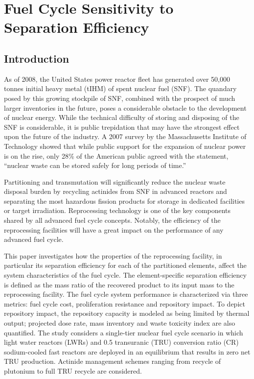 \chapter{Fuel Cycle Sensitivity to Separation Efficiency}
\label{ses_paper}



\section{Introduction}
\label{ses_sec:intro}
As of 2008, the United States power reactor fleet has generated over
50,000 tonnes initial heavy metal (tIHM) of spent nuclear fuel (SNF). 
The quandary posed by this growing stockpile of SNF, combined with the
prospect of much larger inventories in the future, poses a considerable
obstacle to the development of nuclear energy.  While the technical
difficulty of storing and disposing of the SNF is considerable, it is
public trepidation that may have the strongest effect upon the future of
the industry.  A 2007 survey by the Massachusetts Institute of
Technology showed that while public support for the expansion of nuclear
power is on the rise, only 28\% of the American public agreed with the
statement, ``nuclear waste can be stored safely for long periods
of time.'' \cite{}

Partitioning and transmutation will significantly reduce the nuclear
waste disposal burden by recycling actinides from SNF in advanced
reactors and separating the most hazardous fission products for storage
in dedicated facilities or target irradiation.  Reprocessing technology
is one of the key components shared by all advanced fuel cycle concepts.
 Notably, the efficiency of the reprocessing facilities will have a
great impact on the performance of any advanced fuel cycle. 

This paper investigates how the properties of the reprocessing facility,
in particular its separation efficiency for each of the partitioned
elements, affect the system characteristics of the fuel cycle. The
element-specific separation efficiency is defined as the mass ratio of
the recovered product to its input mass to the reprocessing facility. 
The fuel cycle system performance is characterized via three metrics:
fuel cycle cost, proliferation resistance and repository impact.  To
depict repository impact, the repository capacity is modeled as being
limited by thermal output; projected dose rate, mass inventory and waste
toxicity index are also quantified.  The study considers a single-tier
nuclear fuel cycle scenario in which light water reactors (LWRs) and 0.5
transuranic (TRU) conversion ratio (CR) sodium-cooled fast reactors are
deployed in an equilibrium that results in zero net TRU production. 
Actinide management schemes ranging from recycle of plutonium to full
TRU recycle are considered.

